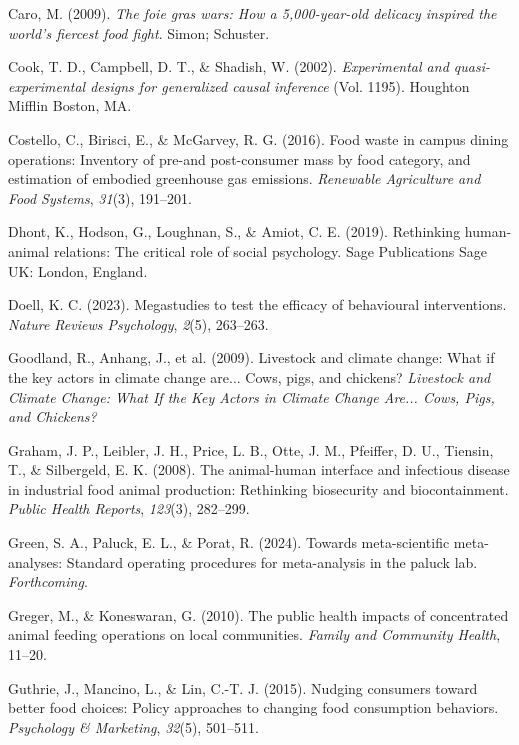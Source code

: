 \documentclass[
  man]{apa6}
\newlength{\cslhangindent}
\newenvironment{CSLReferences}[2] %
 {\begin{list}{}{%
  \setlength{\itemindent}{0pt}
  \setlength{\leftmargin}{0pt}
  \setlength{\parsep}{0pt}
  \ifodd #1
   \setlength{\leftmargin}{\cslhangindent}
   \setlength{\itemindent}{-1\cslhangindent}
  \fi
  \setlength{\itemsep}{#2\baselineskip}}}
 {\end{list}}
\begin{document}
\begin{CSLReferences}{1}{0}
Caro, M. (2009). \emph{The foie gras wars: How a 5,000-year-old delicacy inspired the world's fiercest food fight}. Simon; Schuster.

Cook, T. D., Campbell, D. T., \& Shadish, W. (2002). \emph{Experimental and quasi-experimental designs for generalized causal inference} (Vol. 1195). Houghton Mifflin Boston, MA.

Costello, C., Birisci, E., \& McGarvey, R. G. (2016). Food waste in campus dining operations: Inventory of pre-and post-consumer mass by food category, and estimation of embodied greenhouse gas emissions. \emph{Renewable Agriculture and Food Systems}, \emph{31}(3), 191--201.

Dhont, K., Hodson, G., Loughnan, S., \& Amiot, C. E. (2019). Rethinking human-animal relations: The critical role of social psychology. Sage Publications Sage UK: London, England.

Doell, K. C. (2023). Megastudies to test the efficacy of behavioural interventions. \emph{Nature Reviews Psychology}, \emph{2}(5), 263--263.

Goodland, R., Anhang, J., et al. (2009). Livestock and climate change: What if the key actors in climate change are... Cows, pigs, and chickens? \emph{Livestock and Climate Change: What If the Key Actors in Climate Change Are... Cows, Pigs, and Chickens?}

Graham, J. P., Leibler, J. H., Price, L. B., Otte, J. M., Pfeiffer, D. U., Tiensin, T., \& Silbergeld, E. K. (2008). The animal-human interface and infectious disease in industrial food animal production: Rethinking biosecurity and biocontainment. \emph{Public Health Reports}, \emph{123}(3), 282--299.

Green, S. A., Paluck, E. L., \& Porat, R. (2024). Towards meta-scientific meta-analyses: Standard operating procedures for meta-analysis in the paluck lab. \emph{Forthcoming}.

Greger, M., \& Koneswaran, G. (2010). The public health impacts of concentrated animal feeding operations on local communities. \emph{Family and Community Health}, 11--20.

Guthrie, J., Mancino, L., \& Lin, C.-T. J. (2015). Nudging consumers toward better food choices: Policy approaches to changing food consumption behaviors. \emph{Psychology \& Marketing}, \emph{32}(5), 501--511.


\end{CSLReferences}
\end{document}
